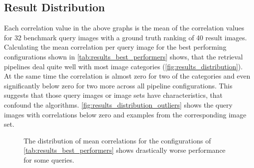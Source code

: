 \subsection{Result Distribution}\label{sec:results_distribution}

Each correlation value in the above graphs is the mean of the correlation
values for 32 benchmark query images with a ground truth ranking of 40 result
images. Calculating the mean correlation per query image for the best
performing configurations shown in \autoref{tab:results_best_performers} shows,
that the retrieval pipelines deal quite well with most image categories
(\autoref{fig:results_distribution}). At the same time the correlation is
almost zero for two of the categories and even significantly below zero for two
more across all pipeline configurations. This suggests that those query images
or image sets have characteristics, that confound the algorithms.
\autoref{fig:results_distribution_outliers} shows the query images with
correlations below zero and examples from the corresponding image set.

\begin{figure}[h]
    \centering
    
    \caption[Distribution of results]{
        The distribution of mean correlations for the configurations of
        \autoref{tab:results_best_performers} shows drastically worse
        performance for some queries.
    }
    \label{fig:results_distribution}
\end{figure}


